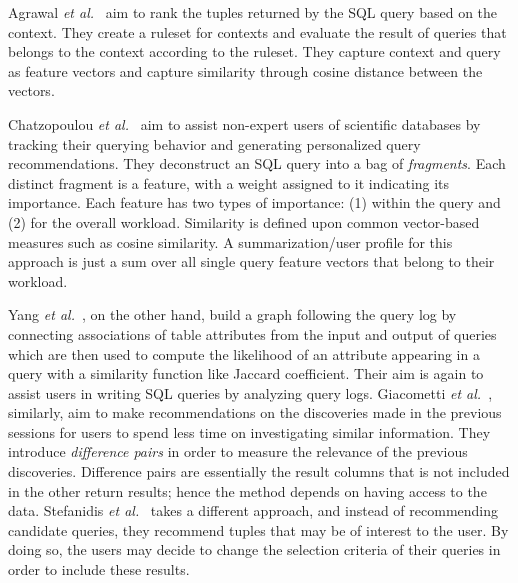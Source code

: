 
Agrawal \textit{et al.}~\cite{agrawal2006context} aim to rank the tuples returned by the SQL query based on the context.
They create a ruleset for contexts and evaluate the result of queries that belongs to the context according to the ruleset.
They capture context and query as feature vectors and capture similarity through cosine distance between the vectors.

Chatzopoulou \textit{et al.}~\cite{chatzopoulou2011querie} aim to assist non-expert users of scientific databases by tracking their querying behavior and generating personalized query recommendations.
They deconstruct an SQL query into a bag of \textit{fragments}.
Each distinct fragment is a feature, with a weight assigned to it indicating its importance.
Each feature has two types of importance: (1) within the query and (2) for the overall workload.
Similarity is defined upon common vector-based measures such as cosine similarity.
A summarization/user profile for this approach is just a sum over all single query feature vectors that belong to their workload.

Yang \textit{et al.}~\cite{yang2009}, on the other hand, build a graph following
the query log by connecting associations of table attributes from the input and output of queries which are then used to compute the likelihood of an attribute appearing in a query with a similarity function like Jaccard coefficient.
Their aim is again to assist users in writing SQL queries by analyzing query logs. Giacometti \textit{et al.}~\cite{giacometti2009}, similarly, aim to make recommendations on the discoveries made in the previous sessions for users to spend less time on investigating similar information.
They introduce \textit{difference pairs} in order to measure the relevance of the previous discoveries.
Difference pairs are essentially the result columns that is not included in the other return results; hence the method depends on having access to the data.
Stefanidis \textit{et al.}~\cite{stefanidis2009you} takes a different approach, and instead of recommending candidate queries, they recommend tuples that may be of interest to the user.
By doing so, the users may decide to change the selection criteria of their queries in order to include these results.

